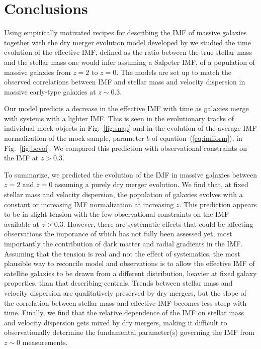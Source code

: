 \documentclass[usenatbib]{mnras}
\def\Fref#1{Fig.~\ref{#1}\xspace}
\def\Eref#1{equation~(\ref{#1})\xspace}
\begin{document}
\section{Conclusions}\label{sect:concl} 

Using empirically motivated recipes for describing the IMF of massive
galaxies together with the dry merger evolution model developed by
\citet{Nip++12} we studied the time evolution of the effective IMF,
defined as the ratio between the true stellar mass and the stellar
mass one would infer assuming a Salpeter IMF, of a population of
massive galaxies from $z=2$ to $z=0$.  The models are set up to match
the observed correlations between IMF and stellar mass and velocity
dispersion in massive early-type galaxies at $z\sim0.3$.

Our model predicts a decrease in the effective IMF with time as
galaxies merge with systems with a lighter IMF. This is seen in the
evolutionary tracks of individual mock objects in \Fref{fig:snap} and
in the evolution of the average IMF normalization of the mock sample,
parameter $b$ of \Eref{eq:imfform}, in \Fref{fig:bevol}.  We compared
this prediction with observational constraints on the IMF at $z>0.3$.

To summarize, we predicted the evolution of the IMF in massive
galaxies between $z=2$ and $z=0$ assuming a purely dry merger
evolution.  We find that, at fixed stellar mass and velocity
dispersion, the population of galaxies evolves with a constant or
increasing IMF normalization at increasing $z$.  This prediction
appears to be in slight tension with the few observational constraints
on the IMF available at $z>0.3$. However, there are systematic effects
that could be affecting observations the imporance of which has not
fully been assessed yet, most importantly the contribution of dark
matter and radial gradients in the IMF.  
Assuming that the tension is real and not the effect of systematics, the most plausible way to reconcile model and observations is to allow the effective IMF of satellite galaxies to be drawn from a different distribution, heavier at fixed galaxy properties, than that describing centrals.
Trends between stellar mass
and velocity dispersion are qualitatively preserved by dry mergers,
but the slope of the correlation between stellar mass and effective
IMF becomes less steep with time.  Finally, we find that the relative
dependence of the IMF on stellar mass and velocity dispersion gets
mixed by dry mergers, making it difficult to observationally determine
the fundamental parameter(s) governing the IMF from $z\sim0$
measurements.
\end{document}
